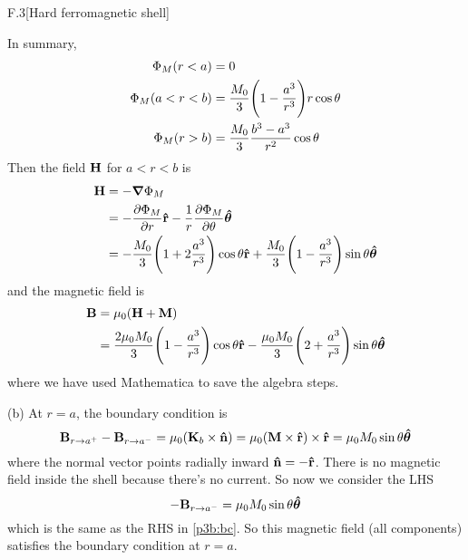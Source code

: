 \documentclass[12pt]{article}
\begin{document}
\begin{problem}{F.3}[Hard ferromagnetic shell]
\begin{solution}
In summary,
\begin{subequations}
    \begin{align}
        \Phi_M(r<a)&=0\\
        \Phi_M(a<r<b)&=\frac{M_0}{3}\qty(1-\frac{a^3}{r^3})r\cos\theta\\
        \Phi_M(r>b)&=\frac{M_0}{3}\frac{b^3-a^3}{r^2}\cos\theta
    \end{align} 
\end{subequations}
Then the field $\vb{H}$ for $a<r<b$ is
\begin{align}
    \vb{H}&=-\grad\Phi_M\notag\\
          &=-\frac{\partial\Phi_M}{\partial
          r}\vb{\hat{r}}-\frac1r\frac{\partial\Phi_M}{\partial\theta}\bm{\hat{\theta}}\notag\\
          &=-\frac{M_0}{3}\qty(1+2\frac{a^3}{r^3})\cos\theta\vb{\hat{r}}+\frac{M_0}{3}\qty(1-\frac{a^3}{r^3})\sin\theta\bm{\hat{\theta}}
\end{align}
and the magnetic field is
\begin{align} 
    \vb{B}&=\mu_0\qty(\vb{H}+\vb{M})\notag\\
          &=\frac{2\mu_0M_0}{3}\qty(1-\frac{a^3}{r^3})\cos\theta\vb{\hat{r}}
          -\frac{\mu_0M_0}{3}\qty(2+\frac{a^3}{r^3})\sin\theta\bm{\hat{\theta}}
\end{align}
where we have used Mathematica to save the algebra steps.

(b) At $r=a$, the boundary condition is
\begin{equation}\label{p3b:bc}
    \vb{B}_{r\to a^+}-\vb{B}_{r\to a^-}=\mu_0\qty(\vb{K}_b\times\vb{\hat{n}})
    =\mu_0\qty(\vb{M}\times\vb{\hat{r}})\times\vb{\hat{r}}
    =\mu_0M_0\sin\theta\bm{\hat{\theta}}
\end{equation}
where the normal vector points radially inward $\vb{\hat{n}}=-\vb{\hat{r}}$. There is no
magnetic field inside the shell because there's no current. So now we consider
the LHS
\begin{equation}
    -\vb{B}_{r\to a^-}=\mu_0M_0\sin\theta\bm{\hat{\theta}}
\end{equation}
which is the same as the RHS in \eqref{p3b:bc}. So this magnetic field (all
components) satisfies the boundary condition at $r=a$.
\end{solution}
\end{problem}
\end{document}

